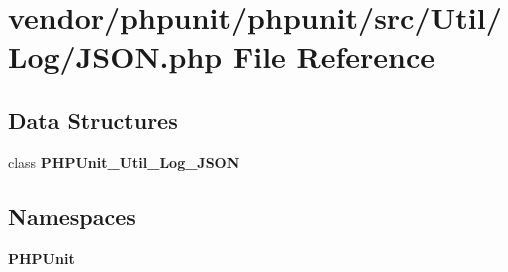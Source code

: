 \section{vendor/phpunit/phpunit/src/\+Util/\+Log/\+J\+S\+O\+N.php File Reference}
\label{phpunit_2phpunit_2src_2_util_2_log_2_j_s_o_n_8php}
\subsection*{Data Structures}
\begin{DoxyCompactItemize}
\item 
class {\bf P\+H\+P\+Unit\+\_\+\+Util\+\_\+\+Log\+\_\+\+J\+S\+O\+N}
\end{DoxyCompactItemize}
\subsection*{Namespaces}
\begin{DoxyCompactItemize}
\item 
 {\bf P\+H\+P\+Unit}
\end{DoxyCompactItemize}
